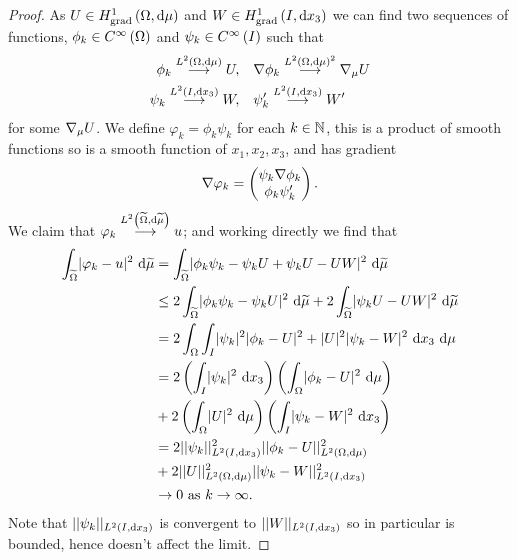 \begin{proof}
	As $U\in H^1_\mathrm{grad}\left( \Omega, \mathrm{d}\mu \right)$ and $W\in H^1_\mathrm{grad}\left( I, \mathrm{d}x_3 \right)$ we can find two sequences of functions, $\phi_{k}\in C^{\infty}\left( \Omega \right)$ and $\psi_{k}\in C^{\infty}\left( I \right)$ such that
	\begin{align*}
		\phi_k \overset{L^{2}\left( \Omega,\mathrm{d}\mu \right)}{\longrightarrow} U, &\quad \nabla\phi_k \overset{L^{2}\left( \Omega,\mathrm{d}\mu \right)^2}{\longrightarrow} \nabla_{\mu}U \\
		\psi_k \overset{L^{2}\left( I,\mathrm{d}x_3 \right)}{\longrightarrow} W, &\quad \psi'_k \overset{L^{2}\left( I,\mathrm{d}x_3 \right)}{\longrightarrow} W' \\
	\end{align*}
	for some $\nabla_\mu U$.
	We define $\varphi_k = \phi_k\psi_k$ for each $k\in\mathbb{N}$, this is a product of smooth functions so is a smooth function of $x_1, x_2, x_3$, and has gradient
	\begin{align*}
		\nabla\varphi_k = 
		\begin{pmatrix}
			\psi_k\nabla\phi_k \\
			\phi_k\psi'_k
		\end{pmatrix}.
	\end{align*}
	We claim that $\varphi_k\overset{L^{2}\left( \widetilde{\Omega},\mathrm{d}\widetilde{\mu} \right)}{\longrightarrow}u$; and working directly we find that
	\begin{align*}
		\begin{split}
			\int_{\widetilde{\Omega}}\lvert \varphi_k-u \rvert^2 \ \mathrm{d}\widetilde{\mu} &= \int_{\widetilde{\Omega}}\lvert \phi_k\psi_k-\psi_k U + \psi_k U - UW \rvert^2 \ \mathrm{d}\widetilde{\mu} \\
			&\leq 2\int_{\widetilde{\Omega}}\lvert \phi_k\psi_k - \psi_k U \rvert^2 \ \mathrm{d}\widetilde{\mu} + 2\int_{\widetilde{\Omega}}\lvert \psi_k U - UW \rvert^2 \ \mathrm{d}\widetilde{\mu} \\
			&= 2\int_{\Omega}\int_{I}\lvert \psi_k \rvert^2\lvert \phi_k - U \rvert^2 + \lvert U \rvert^2 \lvert \psi_k - W \rvert^2 \ \mathrm{d}x_3 \ \mathrm{d}\mu \\
			&= 2\left( \int_{I}\lvert \psi_k \rvert^2 \ \mathrm{d}x_3 \right)\left( \int_{\Omega}\lvert \phi_k - U \rvert^2 \ \mathrm{d}\mu \right) \\
			&+ 2\left( \int_{\Omega}\lvert U \rvert^2 \ \mathrm{d}\mu \right)\left( \int_{I}\lvert \psi_k - W \rvert^2 \ \mathrm{d}x_3 \right) \\
			&= 2\lvert\lvert \psi_k \rvert\rvert_{L^{2}\left( I,\mathrm{d}x_3 \right)}^2\lvert\lvert \phi_k - U \rvert\rvert_{L^{2}\left( \Omega,\mathrm{d}\mu \right)}^2 \\
			&+ 2\lvert\lvert U \rvert\rvert_{L^{2}\left( \Omega,\mathrm{d}\mu \right)}^2\lvert\lvert \psi_k - W \rvert\rvert_{L^{2}\left( I,\mathrm{d}x_3 \right)}^2 \\
			&\rightarrow 0 \ \text{as} \ k \rightarrow\infty.
		\end{split}
	\end{align*}
	Note that $\lvert\lvert \psi_k \rvert\rvert_{L^{2}\left( I,\mathrm{d}x_3 \right)}$ is convergent to $\lvert\lvert W \rvert\rvert_{L^{2}\left( I,\mathrm{d}x_3 \right)}$ so in particular is bounded, hence doesn't affect the limit.

\end{proof}
